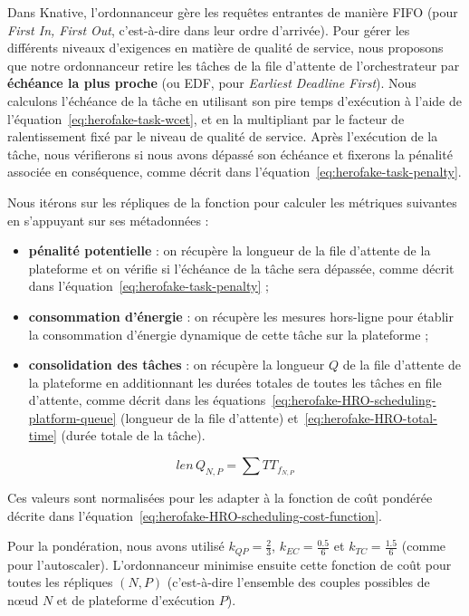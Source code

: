 Dans Knative, l'ordonnanceur gère les requêtes entrantes de manière \gls{FIFO} (pour \textit{First In, First Out}, c'est-à-dire dans leur ordre d'arrivée). Pour gérer les différents niveaux d'exigences en matière de qualité de service, nous proposons que notre ordonnanceur retire les tâches de la file d'attente de l'orchestrateur par \textbf{échéance la plus proche} (ou \gls{EDF}, pour \textit{Earliest Deadline First}). Nous calculons l'échéance de la tâche en utilisant son pire temps d'exécution à l'aide de l'équation~\ref{eq:herofake-task-wcet}, et en la multipliant par le facteur de ralentissement fixé par le niveau de qualité de service. Après l'exécution de la tâche, nous vérifierons si nous avons dépassé son échéance et fixerons la pénalité associée en conséquence, comme décrit dans l'équation~\ref{eq:herofake-task-penalty}. 

Nous itérons sur les répliques de la fonction pour calculer les métriques suivantes en s'appuyant sur ses métadonnées :

\begin{itemize}
    \item \textbf{pénalité potentielle} : on récupère la longueur de la file d'attente de la plateforme et on vérifie si l'échéance de la tâche sera dépassée, comme décrit dans l'équation~\ref{eq:herofake-task-penalty} ;
    \item \textbf{consommation d'énergie} : on récupère les mesures hors-ligne pour établir la consommation d'énergie dynamique de cette tâche sur la plateforme ;
    \item \textbf{consolidation des tâches} : on récupère la longueur $Q$ de la file d'attente de la plateforme en additionnant les durées totales de toutes les tâches en file d'attente, comme décrit dans les équations~\ref{eq:herofake-HRO-scheduling-platform-queue} (longueur de la file d'attente) et~\ref{eq:herofake-HRO-total-time} (durée totale de la tâche). 
\end{itemize}

\begin{equation}
    len \, Q_{N, P} = \sum TT_{f_{N, P}}
\label{eq:herofake-HRO-scheduling-platform-queue}
\end{equation}

Ces valeurs sont normalisées pour les adapter à la fonction de coût pondérée décrite dans l'équation~\ref{eq:herofake-HRO-scheduling-cost-function}.

Pour la pondération, nous avons utilisé $k_{QP} = \frac{2}{3}$, $k_{EC} = \frac{0.5}{6}$ et $k_{TC} = \frac{1.5}{6}$ (comme pour l'autoscaler). L'ordonnanceur minimise ensuite cette fonction de coût pour toutes les répliques $(N, P)$ (c'est-à-dire l'ensemble des couples possibles de nœud $N$ et de plateforme d'exécution $P$).

